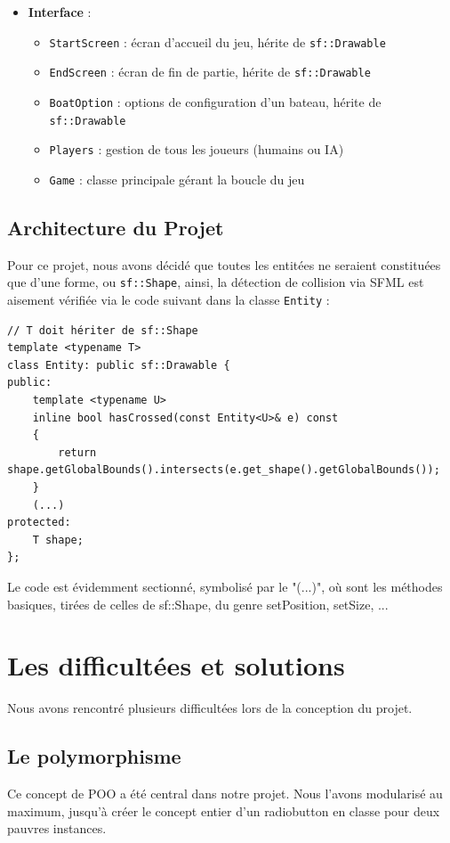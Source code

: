 \documentclass[a4paper,12pt]{article}
\begin{document}
\begin{itemize}
    \item \textbf{Interface} :
    \begin{itemize}
        \item \texttt{StartScreen} : écran d'accueil du jeu, hérite de \texttt{sf::Drawable}
        \item \texttt{EndScreen} : écran de fin de partie, hérite de \texttt{sf::Drawable}
        \item \texttt{BoatOption} : options de configuration d'un bateau, hérite de \texttt{sf::Drawable}
        \item \texttt{Players} : gestion de tous les joueurs (humains ou IA)
        \item \texttt{Game} : classe principale gérant la boucle du jeu
    \end{itemize}
\end{itemize}

\subsection{Architecture du Projet}
Pour ce projet, nous avons décidé que toutes les entitées ne seraient constituées que d'une forme, ou \texttt{sf::Shape}, ainsi, la détection de collision via SFML est aisement vérifiée via le code suivant dans la classe \texttt{Entity} :

\begin{lstlisting}
// T doit hériter de sf::Shape
template <typename T>
class Entity: public sf::Drawable {
public:
    template <typename U>
    inline bool hasCrossed(const Entity<U>& e) const
    {
        return shape.getGlobalBounds().intersects(e.get_shape().getGlobalBounds());
    }
    (...)
protected:
    T shape;
};
\end{lstlisting}
Le code est évidemment sectionné, symbolisé par le "(...)", où sont les méthodes basiques, tirées de celles de sf::Shape, du genre setPosition, setSize, ...

\section {Les difficultées et solutions}
Nous avons rencontré plusieurs difficultées lors de la conception du projet.
\subsection{Le polymorphisme}
    Ce concept de POO a été central dans notre projet.
    Nous l'avons modularisé au maximum,
    jusqu'à créer le concept entier d'un radiobutton en classe pour
    deux pauvres instances.
\end{document}
